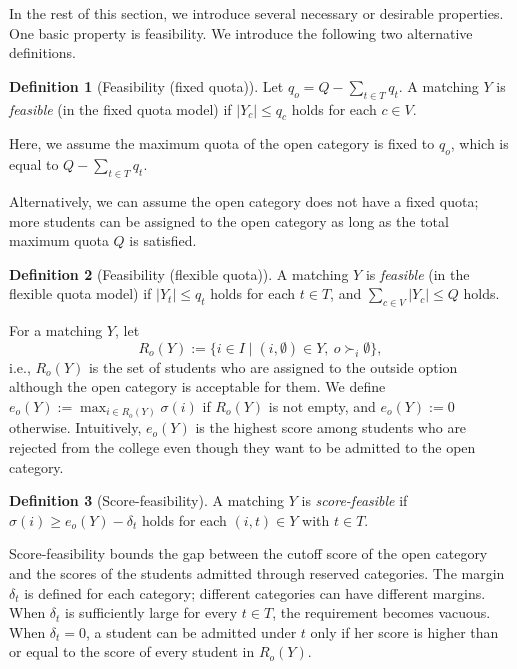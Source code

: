 \documentclass[a4paper,twoside]{article}
\theoremstyle{definition}
\newtheorem{definition}{Definition}
\begin{document}
In the rest of this section, we introduce several necessary or desirable properties. 
One basic property is feasibility. We introduce the following two alternative 
definitions. 

\begin{definition}[Feasibility (fixed quota)]
\label{def:feasibility}
Let $q_o= Q - \sum_{t \in T} q_t$. 
A matching $Y$ is \emph{feasible} (in the fixed quota model) 
if $|Y_c|\le q_c$ holds for each $c\in V$.
\end{definition}
Here, we assume the maximum quota of the open category is fixed to $q_o$, which 
is equal to $Q - \sum_{t\in T} q_t$. 

Alternatively, we can assume the open category does not have a fixed quota; more students 
can be assigned to the open category as long as the total maximum quota $Q$ is satisfied. 
\begin{definition}[Feasibility (flexible quota)]
\label{def:flexfeasibility}
A matching $Y$ is \emph{feasible} (in the flexible quota model) 
if $|Y_t|\le q_t$ holds for each $t\in T$, and 
$\sum_{c \in V} |Y_c| \leq Q$ holds. 
\end{definition}

For a matching $Y$, let
\begin{equation}
\label{eq:Ro}
R_o(Y):=\{i\in I\mid (i,\emptyset)\in Y,\ o\succ_i\emptyset\},
\end{equation}
i.e., $R_o(Y)$ is the set of students who are assigned to the outside option although
the open category is acceptable for them.
We define $e_o(Y):=\max_{i\in R_o(Y)}\sigma(i)$ if $R_o(Y)$ is not empty, and
$e_o(Y):=0$ otherwise.
Intuitively, $e_o(Y)$ is the highest score among students who are rejected from the college
even though they want to be admitted to the open category.

\begin{definition}[Score-feasibility]
\label{def:sf}
A matching $Y$ is \emph{score-feasible} if $\sigma(i)\ge e_o(Y)-\delta_t$ holds for each
$(i,t)\in Y$ with $t\in T$.
\end{definition}

Score-feasibility bounds the gap between the cutoff score of the open category and the
scores of the students admitted through reserved categories.
The margin $\delta_t$ is defined for each category; different categories can have different margins.
When $\delta_t$ is sufficiently large for every $t\in T$, the requirement becomes vacuous.
When $\delta_t=0$, a student can be admitted under $t$ only if her score is higher than or equal to 
the score of every student in $R_o(Y)$.
\end{document}
